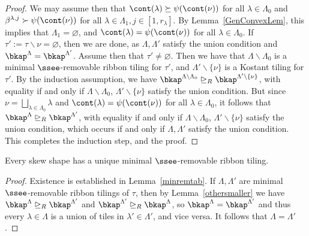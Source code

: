 \begin{proof}
We may assume then that \(\cont(\lambda) \succeq \psi(\cont(\nu))\) for all \(\lambda \in \Lambda_0\) and \(\beta^{\lambda,j} \succ \psi(\cont(\nu))\) for all \(\lambda \in \Lambda_1, j \in [1,r_\lambda]\). By Lemma~\ref{GenConvexLem}, this implies that \(\Lambda_1 = \varnothing\), and \(\cont(\lambda) = \psi(\cont(\nu))\) for all \(\lambda \in \Lambda_0\). If \(\tau':=\tau \backslash \nu = \varnothing\), then we are done, as \(\Lambda, \Lambda'\) satisfy the union condition and \(\bkap^\Lambda = \bkap^{\Lambda'}\). Assume then that \(\tau' \neq \varnothing\). Then we have that \(\Lambda \backslash \Lambda_{0}\) is a minimal \(\ssee\)-removable ribbon tiling for \(\tau'\), and \(\Lambda'\backslash\{\nu\}\) is a Kostant tiling for \(\tau'\). By the induction assumption, we have \(\bkap^{\Lambda \backslash \Lambda_{0}} \trianglerighteq_R \bkap^{\Lambda' \backslash \{\nu\}}\), with equality if and only if \(\Lambda \backslash \Lambda_{0}\), \( \Lambda' \backslash \{\nu\}\) satisfy the union condition. But since \(\nu = \bigsqcup_{\lambda \in \Lambda_0} \lambda\) and \(\cont(\lambda) = \psi(\cont(\nu))\) for all \(\lambda \in \Lambda_0\), it follows that \(\bkap^\Lambda \trianglerighteq_R \bkap^{\Lambda'}\), with equality if and only if \(\Lambda \backslash \Lambda_{0}\), \( \Lambda' \backslash \{\nu\}\) satisfy the union condition, which occurs if and only if \(\Lambda, \Lambda'\) satisfy the union condition. This completes the induction step, and the proof.
\end{proof} 

\begin{coro}\label{uniquerib}
Every skew shape has a unique minimal \(\ssee\)-removable ribbon tiling.
\end{coro}
\begin{proof}
Existence is established in Lemma~\ref{minremtab}.
If \(\Lambda, \Lambda'\) are minimal \(\ssee\)-removable ribbon tilings of \(\tau\), then by Lemma~\ref{othersmaller} we have \(\bkap^{\Lambda} \trianglerighteq_R \bkap^{\Lambda'}\) and \(\bkap^{\Lambda'} \trianglerighteq_R \bkap^{\Lambda}\), so \(\bkap^{\Lambda} = \bkap^{\Lambda'}\) and thus every \(\lambda \in \Lambda\) is a union of tiles in \(\lambda' \in \Lambda'\), and vice versa. It follows that \(\Lambda = \Lambda'\).
\end{proof}

